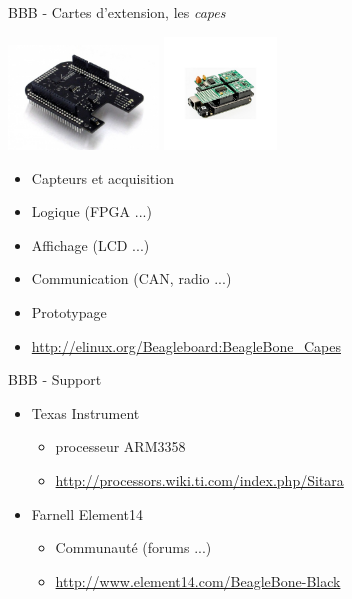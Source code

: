 \documentclass{beamer}
\begin{document}
\begin{frame}{BBB - Cartes d'extension, les \textit{capes}}
  \begin{center}
    \includegraphics[width=40mm]{./pic/cape_shield.jpg}
    \hspace{4.00mm}
    \includegraphics[width=30mm]{./pic/cape_mikrobus.jpg}
  \end{center}

  \begin{tiny}
    \begin{itemize}
    \item Capteurs et acquisition
    \item Logique (FPGA ...)
    \item Affichage (LCD ...)
    \item Communication (CAN, radio ...)
    \item Prototypage
    \item \url{http://elinux.org/Beagleboard:BeagleBone_Capes}
    \end{itemize}
  \end{tiny}

\end{frame}


\begin{frame}{BBB - Support}
  \begin{small}
    \begin{itemize}
    \item Texas Instrument
      \begin{itemize}
      \item processeur ARM3358
      \item \url{http://processors.wiki.ti.com/index.php/Sitara}
      \end{itemize}
    \item Farnell Element14
      \begin{itemize}
      \item Communaut\'{e} (forums ...)
      \item \url{http://www.element14.com/BeagleBone-Black}
      \end{itemize}
    \end{itemize}
  \end{small}
\end{frame}
\end{document}

